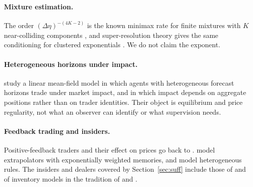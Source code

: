 \paragraph{Mixture estimation.} The order $(\Delta\eta)^{-(4K-2)}$ is the known minimax rate for finite mixtures with $K$ near-colliding components \citep{heinrich2018,wu2020}, and super-resolution theory gives the same conditioning for clustered exponentials \citep{moitra2015,batenkov2021,katz2023}. We do not claim the exponent.

\paragraph{Heterogeneous horizons under impact.} \citet{leclere2026} study a linear mean-field model in which agents with heterogeneous forecast horizons trade under market impact, and in which impact depends on aggregate positions rather than on trader identities. Their object is equilibrium and price regularity, not what an observer can identify or what supervision needs.

\paragraph{Feedback trading and insiders.} Positive-feedback traders and their effect on prices go back to \citet{delong1990}. \citet{barberis2015,barberis2018} model extrapolators with exponentially weighted memories, and \citet{brock1998} model heterogeneous rules. The insiders and dealers covered by Section~\ref{sec:suff} include those of \citet{kyle1985} and of inventory models in the tradition of \citet{hostoll1981} and \citet{grossman1988}.

